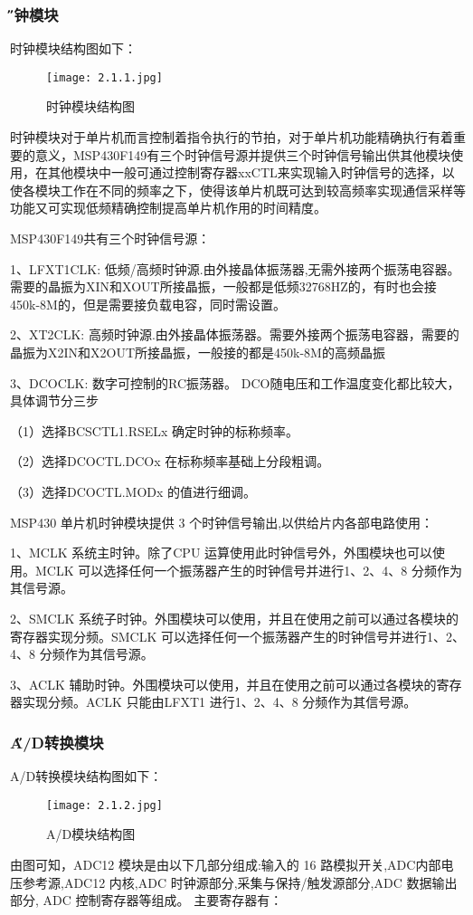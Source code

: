 \documentclass[12pt,a4paper]{article} %
\begin{document}
	 	\subsubsection{\H 时钟模块} 
	 	时钟模块结构图如下：
	 	\begin{figure}[H] %
 		  \centering
 		  \texttt{[image: 2.1.1.jpg]} 
  		  \caption{时钟模块结构图}
  		 \label{fig:2.1.1}
		\end{figure}
		时钟模块对于单片机而言控制着指令执行的节拍，对于单片机功能精确执行有着重要的意义，MSP430F149有三个时钟信号源并提供三个时钟信号输出供其他模块使用，在其他模块中一般可通过控制寄存器xxCTL来实现输入时钟信号的选择，以使各模块工作在不同的频率之下，使得该单片机既可达到较高频率实现通信采样等功能又可实现低频精确控制提高单片机作用的时间精度。
		\par MSP430F149共有三个时钟信号源：
		\par 1、LFXT1CLK: 低频/高频时钟源.由外接晶体振荡器,无需外接两个振荡电容器。需要的晶振为XIN和XOUT所接晶振，一般都是低频32768HZ的，有时也会接450k-8M的，但是需要接负载电容，同时需设置。
		\par 2、XT2CLK: 高频时钟源.由外接晶体振荡器。需要外接两个振荡电容器，需要的晶振为X2IN和X2OUT所接晶振，一般接的都是450k-8M的高频晶振
		\par 3、DCOCLK: 数字可控制的RC振荡器。 DCO随电压和工作温度变化都比较大，具体调节分三步
		\par（1）选择BCSCTL1.RSELx 确定时钟的标称频率。
		\par（2）选择DCOCTL.DCOx 在标称频率基础上分段粗调。
		\par（3）选择DCOCTL.MODx 的值进行细调。
		
		\par MSP430 单片机时钟模块提供 3 个时钟信号输出,以供给片内各部电路使用：
		\par 1、MCLK 系统主时钟。除了CPU 运算使用此时钟信号外，外围模块也可以使用。MCLK 可以选择任何一个振荡器产生的时钟信号并进行1、2、4、8 分频作为其信号源。
		\par 2、SMCLK 系统子时钟。外围模块可以使用，并且在使用之前可以通过各模块的寄存器实现分频。SMCLK 可以选择任何一个振荡器产生的时钟信号并进行1、2、4、8 分频作为其信号源。
		\par 3、ACLK 辅助时钟。外围模块可以使用，并且在使用之前可以通过各模块的寄存器实现分频。ACLK 只能由LFXT1 进行1、2、4、8 分频作为其信号源。
	 	
	 	\subsubsection{\H A/D转换模块} 
	 	A/D转换模块结构图如下：
	 	\begin{figure}[H] %
 		  \centering
 		  \texttt{[image: 2.1.2.jpg]} 
  		  \caption{A/D模块结构图}
  		 \label{fig:2.1.2}
		\end{figure}
		由图可知，ADC12 模块是由以下几部分组成:输入的 16 路模拟开关,ADC内部电压参考源,ADC12 内核,ADC 时钟源部分,采集与保持/触发源部分,ADC 数据输出部分, ADC 控制寄存器等组成。
		主要寄存器有：
		
\end{document}
